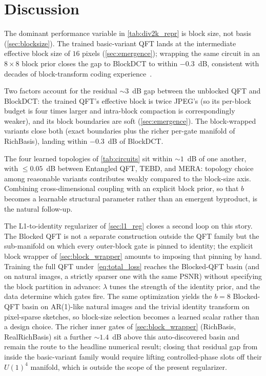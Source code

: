\documentclass[a4paper, twocolumn]{quantumarticle}
\begin{document}

\section{Discussion}
\label{sec:discussion}

The dominant performance variable in \cref{tab:div2k_repr} is block size, not basis (\cref{sec:blocksize}). The trained basic-variant QFT lands at the intermediate effective block size of $16$ pixels (\cref{sec:emergence}); wrapping the same circuit in an $8 \times 8$ block prior closes the gap to BlockDCT to within $-0.3$~dB, consistent with decades of block-transform coding experience~\cite{wallace1992jpeg, britanak2007}.

Two factors account for the residual $\sim\!3$~dB gap between the unblocked QFT and BlockDCT: the trained QFT's effective block is twice JPEG's (so its per-block budget is four times larger and intra-block compaction is correspondingly weaker), and its block boundaries are soft (\cref{sec:emergence}). The block-wrapped variants close both (exact boundaries plus the richer per-gate manifold of RichBasis), landing within $-0.3$~dB of BlockDCT.

The four learned topologies of \cref{tab:circuits} sit within $\sim\!1$~dB of one another, with $\leq 0.05$~dB between Entangled QFT, TEBD, and MERA: topology choice among reasonable variants contributes weakly compared to the block-size axis. Combining cross-dimensional coupling with an explicit block prior, so that $b$ becomes a learnable structural parameter rather than an emergent byproduct, is the natural follow-up.

The L1-to-identity regularizer of \cref{sec:l1_reg} closes a second loop on this story. The Blocked QFT is not a separate construction outside the QFT family but the sub-manifold on which every outer-block gate is pinned to identity; the explicit block wrapper of \cref{sec:block_wrapper} amounts to imposing that pinning by hand. Training the full QFT under~\cref{eq:total_loss} reaches the Blocked-QFT basin (and on natural images, a strictly sparser one with the same PSNR) without specifying the block partition in advance: $\lambda$ tunes the strength of the identity prior, and the data determine which gates fire. The same optimization yields the $b = 8$ Blocked-QFT basin on AR(1)-like natural images and the trivial identity transform on pixel-sparse sketches, so block-size selection becomes a learned scalar rather than a design choice. The richer inner gates of \cref{sec:block_wrapper} (RichBasis, RealRichBasis) sit a further ${\sim}1.4$~dB above this auto-discovered basin and remain the route to the headline numerical result; closing that residual gap from inside the basic-variant family would require lifting controlled-phase slots off their $U(1)^4$ manifold, which is outside the scope of the present regularizer.
\end{document}
